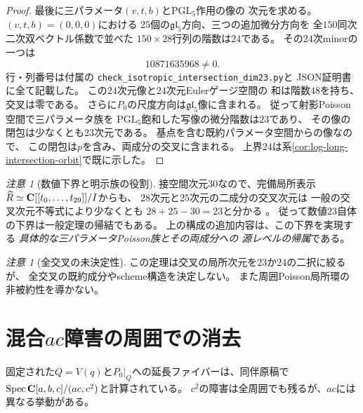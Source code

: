 \documentclass[a4paper,11pt]{ltjsarticle}
\theoremstyle{remark}\newtheorem{remark}[theorem]{注意}
\newcommand{\Spec}{\operatorname{Spec}}\newcommand{\rank}{\operatorname{rank}}
\begin{document}
\begin{proof}
最後に三パラメータ$(v,t,b)$と$\mathrm{PGL}_5$作用の像の
次元を求める。$(v,t,b)=(0,0,0)$における
$25$個の$\mathfrak{gl}_5$方向、三つの追加微分方向を
全$150$同次二次双ベクトル係数で並べた
$150\times28$行列の階数は$24$である。
その$24$次minorの一つは
\[
 \boxed{10871635968\ne0}.
\]
行・列番号は付属の
\texttt{check\_isotropic\_intersection\_dim23.py}と
JSON証明書に全て記載した。
この$24$次元像と$24$次元Eulerゲージ空間の
和は階数$48$を持ち、交叉は零である。
さらに$P_0$の尺度方向は$\mathfrak{gl}_5$像に含まれる。
従って射影Poisson空間で三パラメータ族を
$\mathrm{PGL}_5$飽和した写像の微分階数は$23$であり、
その像の閉包は少なくとも$23$次元である。
基点を含む既約パラメータ空間からの像なので、
この閉包は$p$を含み、両成分の交叉に含まれる。
上界$24$は系\ref{cor:log-long-intersection-orbit}で既に示した。
\end{proof}

\begin{remark}[数値下界と明示族の役割]
接空間次元$30$なので、完備局所表示
$\widehat R\simeq\mathbf C[[t_0,\ldots,t_{29}]]/I$からも、
$28$次元と$25$次元の二成分の交叉次元は
一般の交叉次元不等式により少なくとも
$28+25-30=23$と分かる
\cite[Section 43.13]{StacksIntersect}。
従って数値$23$自体の下界は一般定理の帰結でもある。
上の構成の追加内容は、この下界を実現する
\emph{具体的な三パラメータPoisson族とその両成分への
源レベルの帰属}である。
\end{remark}

\begin{remark}[全交叉の未決定性]
この定理は交叉の局所次元を$23$か$24$の二択に絞るが、
全交叉の既約成分やscheme構造を決定しない。
また周囲Poisson局所環の非被約性を導かない。
\end{remark}



\section{混合\texorpdfstring{$ac$}{ac}障害の周囲での消去}
固定された$Q=V(q)$と$P_0|_Q$への延長ファイバーは、同伴原稿で
$\Spec\CC[a,b,c]/(ac,c^2)$と計算されている。
$c^2$の障害は全周囲でも残るが、$ac$には異なる挙動がある。
\end{document}
